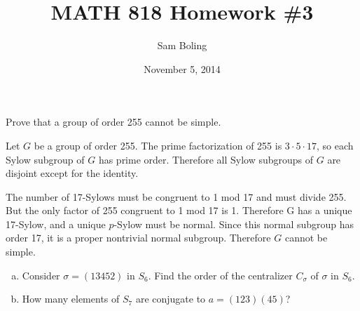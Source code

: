\documentclass{article}
\title{MATH 818 Homework \#3}
\date{November 5, 2014}
\author{Sam Boling}
\newcounter{Problem}
\newenvironment{Problem}{\begin{Exercise}[name={Problem},
                                          counter={Problem}]}
                        {\end{Exercise}}
\begin{document}
\begin{titlepage}
\maketitle
\end{titlepage}

\begin{Problem}
Prove that a group of order 255 cannot be simple.
\end{Problem}

\begin{Answer}
Let $G$ be a group of order 255. The prime factorization of 255 is
$3 \cdot 5 \cdot 17$, so each Sylow subgroup of $G$ has prime
order. Therefore all Sylow subgroups of $G$ are disjoint except for
the identity.

The number of 17-Sylows must be congruent to 1 mod 17 and must divide
255. But the only factor of 255 congruent to 1 mod 17 is 1. Therefore
G has a unique 17-Sylow, and a unique $p$-Sylow must be normal. Since
this normal subgroup has order 17, it is a proper nontrivial normal
subgroup. Therefore $G$ cannot be simple.
\end{Answer}

\pagebreak

\begin{Problem}
\begin{enumerate}[(a)]
  \item{
    Consider $\sigma = (13452)$ in $S_6$. Find the order of the
    centralizer $C_\sigma$ of $\sigma$ in $S_6$.
  }
  \item{
    How many elements of $S_7$ are conjugate to $a = (123)(45)$?
  }
\end{enumerate}
\end{Problem}
\end{document}
